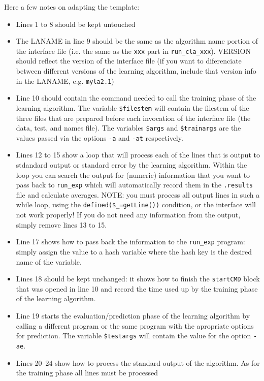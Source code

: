 \documentclass[a4paper,10pt,twoside]{article}
\begin{document}
Here a few notes on adapting the template:
\begin{itemize}
\item Lines 1 to 8 should be kept untouched
\item The LANAME in  line 9 should be the same as the algorithm 
name portion of the interface file (i.e. the same as the 
\texttt{xxx} part in \texttt{run\_cla\_xxx}). VERSION should 
reflect the version of the interface file (if you want to 
diferenciate between different versions of the learning algorithm,
include that version info in the LANAME, e.g. \texttt{myla2.1})
\item Line 10 should contain the command needed to call the 
training phase of the learning algorithm. The variable \texttt{\$filestem}
will contain the filestem of the three files that are prepared before
each invocation of the interface file (the data, test, and names file).
The variables \texttt{\$args} and \texttt{\$trainargs} are the values
passed via the options \texttt{-a} and \texttt{-at} respectively.
\item Lines 12 to 15 show a loop that will process each of the lines
that is output to stdandard output or standard error by the learning
algorithm. Within the loop you can search the output for
(numeric)  information
that you want to pass back to \texttt{run\_exp} which will 
automatically record them in the \texttt{.results} file and 
calculate averages. NOTE: you must process all output lines
in such a while loop, using the \verb|defined($_=getLine())|
condition, or the interface will not work properly! If you do not
need any information from the output, simply remove lines 13 to 15.
\item Line 17 shows how to pass back the information to the 
\texttt{run\_exp} program: simply assign the value to 
a hash variable where the hash key is the desired name of the variable.
\item Lines 18 should be kept unchanged: it 
shows how to finish the \texttt{startCMD} block
that was opened in line 10 and record the time used up by the
training phase of the learning algorithm. 
\item Line 19 starts the evaluation/prediction phase of the learning
algorithm by calling a different program or the same program with
the apropriate options for prediction. The variable \texttt{\$testargs}
will contain the value for the option \texttt{-ae}.
\item Lines 20--24 show how to process the standard output of the
algorithm. As for the training phase all lines must be processed

\end{itemize}
\end{document}
